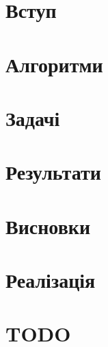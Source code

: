\documentclass[a4paper,14pt,openany,twoside,oldfontcommands]{memoir}
\begin{document}

\newpage

\setcounter{page}{2}


\newpage

\setcounter{tocdepth}{3}
\tableofcontents*
\newpage

\chapter{Вступ}


\chapter{Алгоритми}


\chapter{Задачі}


\chapter{Результати}


\chapter{Висновки}


\newpage
\nocite{*}



\chapter{Реалізація}


\chapter{TODO}

\end{document}

